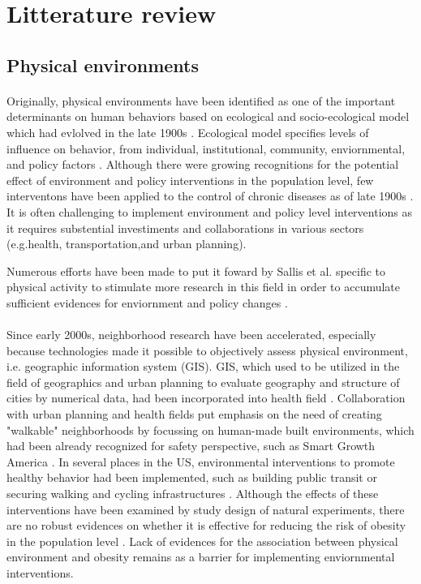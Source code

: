 \documentclass[12]{article}
\begin{document}
\newpage
\section{Litterature review}
\subsection{Physical environments}
\paragraph{}
Originally, physical environments have been identified as one of the important determinants on human behaviors based on ecological and socio-ecological model which had evlolved in the late 1900s \cite{mcleroy1988ecological,sallis1998environmental}. Ecological model specifies levels of influence on behavior, from individual, institutional, community, enviornmental, and policy factors \cite{mcleroy1988ecological}. Although there were growing recognitions for the potential effect of environment and policy interventions in the population level, few interventons have been applied to the control of chronic diseases as of late 1900s \cite{schmid1995policy}. It is often challenging to implement environment and policy level interventions as it requires substential investiments and collaborations in various sectors (e.g.health, transportation,and urban planning).

Numerous efforts have been made to put it foward by Sallis et al. specific to physical activity to stimulate more research in this field in order to accumulate sufficient evidences for enviornment and policy changes \cite{sallis1998environmental}. 
\paragraph{}
Since early 2000s, neighborhood research have been accelerated, especially because technologies made it possible to objectively assess physical environment, i.e. geographic information system (GIS). GIS, which used to be utilized in the field of geographics and urban planning to evaluate geography and structure of cities by numerical data, had been incorporated into health field  \cite{frank2005linking}. Collaboration with urban planning and health fields put emphasis on the need of creating "walkable" neighborhoods by focussing on human-made built environments, which had been already recognized for safety perspective, such as Smart Growth America \cite{smartgrowth}.
In several places in the US, environmental interventions to promote healthy behavior had been implemented, such as building public transit or securing walking and cycling infrastructures \cite{brown2015transit,macdonald2010effect}. Although the effects of these interventions have been examined by study design of natural experiments, there are no robust evidences on whether it is effective for reducing the risk of obesity in the population level \cite{tseng2018effectiveness}. Lack of evidences for the association between physical environment and obesity remains as a barrier for implementing enviornmental interventions. 

\newpage

\printbibliography
\end{document}
